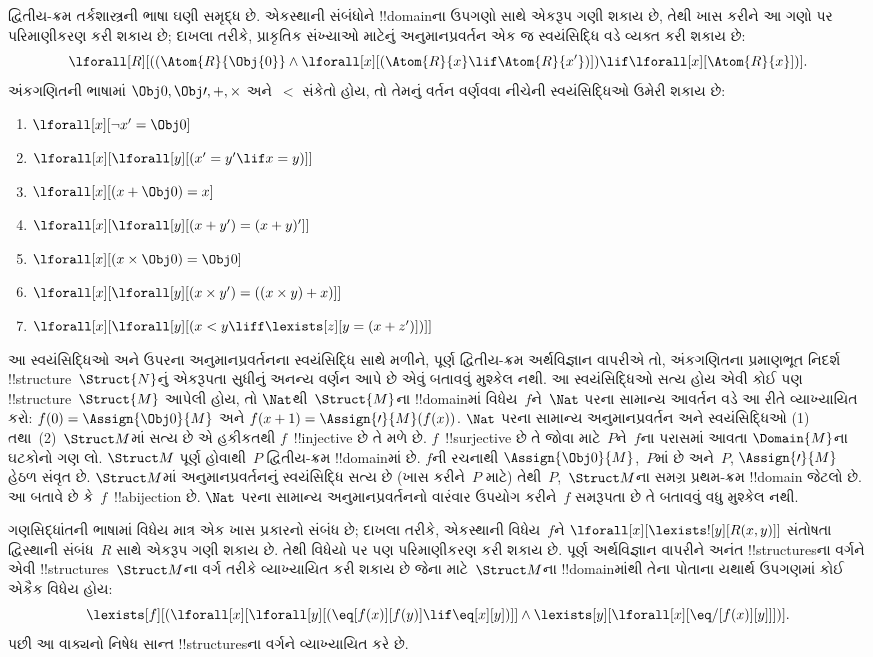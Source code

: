 \documentclass[../../../include/open-logic-section]{subfiles}
\begin{document}
દ્વિતીય-ક્રમ તર્કશાસ્ત્રની ભાષા ઘણી સમૃદ્ધ છે. એકસ્થાની સંબંધોને
!!{domain}ના ઉપગણો સાથે એકરૂપ ગણી શકાય છે, તેથી ખાસ કરીને આ ગણો પર
પરિમાણીકરણ કરી શકાય છે; દાખલા તરીકે, પ્રાકૃતિક સંખ્યાઓ માટેનું
અનુમાનપ્રવર્તન એક જ સ્વયંસિદ્ધિ વડે વ્યક્ત કરી શકાય છે:
\[
\lforall[R][((\Atom{R}{\Obj{0}} \land \lforall[x][(\Atom{R}{x} \lif
    \Atom{R}{x'})]) \lif \lforall[x][\Atom{R}{x}])].
\]
અંકગણિતની ભાષામાં $\Obj 0, \Obj \prime, +, \times$ અને~$<$ સંકેતો
હોય, તો તેમનું વર્તન વર્ણવવા નીચેની સ્વયંસિદ્ધિઓ ઉમેરી શકાય છે:
\begin{enumerate}
\item $\lforall[x][\lnot x' = \Obj 0]$
\item $\lforall[x][\lforall[y][(x' = y' \lif x = y)]]$
\item $\lforall[x][(x + \Obj 0) = x]$
\item $\lforall[x][\lforall[y][(x + y') = (x + y)']]$
\item $\lforall[x][(x \times \Obj 0) = \Obj 0]$
\item $\lforall[x][\lforall[y][(x \times y') = ((x \times y) + x)]]$
\item $\lforall[x][\lforall[y][(x < y \liff \lexists[z][y = (x + z')])]]$
\end{enumerate}
આ સ્વયંસિદ્ધિઓ અને ઉપરના અનુમાનપ્રવર્તનના સ્વયંસિદ્ધિ સાથે મળીને, પૂર્ણ
દ્વિતીય-ક્રમ અર્થવિજ્ઞાન વાપરીએ તો, અંકગણિતના પ્રમાણભૂત નિદર્શ
!!{structure}~$\Struct{N}$નું એકરૂપતા સુધીનું અનન્ય વર્ણન આપે છે એવું
બતાવવું મુશ્કેલ નથી. આ સ્વયંસિદ્ધિઓ સત્ય હોય એવી કોઈ પણ
!!{structure}~$\Struct{M}$ આપેલી હોય, તો $\Nat$થી~$\Struct{M}$ના
!!{domain}માં વિધેય~$f$ને~$\Nat$ પરના સામાન્ય આવર્તન વડે આ રીતે
વ્યાખ્યાયિત કરો: $f(0) = \Assign{\Obj 0}{M}$ અને
$f(x+1) = \Assign{\prime}{M}(f(x))$. $\Nat$ પરના સામાન્ય
અનુમાનપ્રવર્તન અને સ્વયંસિદ્ધિઓ (1) તથા~(2)~$\Struct M$માં સત્ય છે એ
હકીકતથી $f$~!!{injective} છે તે મળે છે. $f$~!!{surjective} છે તે
જોવા માટે~$P$ને~$f$ના પરાસમાં આવતા $\Domain{M}$ના ઘટકોનો ગણ
લો. $\Struct M$ પૂર્ણ હોવાથી~$P$ દ્વિતીય-ક્રમ !!{domain}માં છે.
$f$ની રચનાથી $\Assign{\Obj 0}{M}$,~$P$માં છે અને~$P$,
$\Assign{\prime}{M}$ હેઠળ સંવૃત છે. $\Struct M$માં અનુમાનપ્રવર્તનનું
સ્વયંસિદ્ધિ સત્ય છે (ખાસ કરીને~$P$ માટે) તેથી~$P$,~$\Struct M$ના
સમગ્ર પ્રથમ-ક્રમ !!{domain} જેટલો છે. આ બતાવે છે કે~$f$~!!a{bijection}
છે. $\Nat$ પરના સામાન્ય અનુમાનપ્રવર્તનનો વારંવાર ઉપયોગ કરીને~$f$
સમરૂપતા છે તે બતાવવું વધુ મુશ્કેલ નથી.

ગણસિદ્ધાંતની ભાષામાં વિધેય માત્ર એક ખાસ પ્રકારનો સંબંધ છે; દાખલા
તરીકે, એકસ્થાની વિધેય~$f$ને
$\lforall[x][\lexists![y][R(x,y)]]$ સંતોષતા દ્વિસ્થાની સંબંધ~$R$ સાથે
એકરૂપ ગણી શકાય છે. તેથી વિધેયો પર પણ પરિમાણીકરણ કરી શકાય છે. પૂર્ણ
અર્થવિજ્ઞાન વાપરીને અનંત !!{structure}sના વર્ગને એવી
!!{structure}s~$\Struct M$ના વર્ગ તરીકે વ્યાખ્યાયિત કરી શકાય છે જેના
માટે~$\Struct M$ના !!{domain}માંથી તેના પોતાના યથાર્થ ઉપગણમાં કોઈ
એકૈક વિધેય હોય:
\[
\lexists[f][(\lforall[x][\lforall[y][(\eq[f(x)][f(y)] \lif \eq[x][y])]]
  \land \lexists[y][\lforall[x][\eq/[f(x)][y]]])].
\]
પછી આ વાક્યનો નિષેધ સાન્ત !!{structure}sના વર્ગને વ્યાખ્યાયિત કરે છે.
\end{document}
